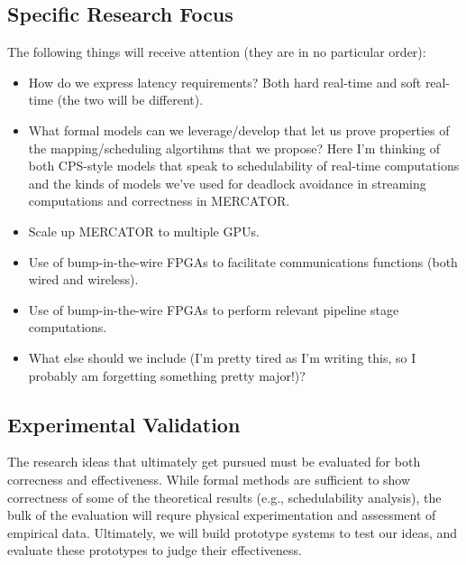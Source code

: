 \subsection{Specific Research Focus}


The following things will receive attention (they are in no particular order):

\begin{itemize}

\item How do we express latency requirements?  Both hard real-time and soft real-time (the two will be different).

\item What formal models can we leverage/develop that let us prove properties of the mapping/scheduling algortihms that we propose? Here I'm thinking of both CPS-style models that speak to schedulability of real-time computations and the kinds of models we've used for deadlock avoidance in streaming computations and correctness in MERCATOR.

\item Scale up MERCATOR to multiple GPUs.

\item Use of bump-in-the-wire FPGAs to facilitate communications functions (both wired and wireless).

\item Use of bump-in-the-wire FPGAs to perform relevant pipeline stage computations.

\item What else should we include (I'm pretty tired as I'm writing this, so I probably am forgetting something pretty major!)?

\end{itemize}

\subsection{Experimental Validation}

The research ideas that ultimately get pursued must be evaluated for both correcness and effectiveness.  While formal methods are sufficient to show correctness of some of the theoretical results (e.g., schedulability analysis), the bulk of the evaluation will requre physical experimentation and assessment of empirical data.  Ultimately, we will build prototype systems to test our ideas, and evaluate these prototypes to judge their effectiveness.

